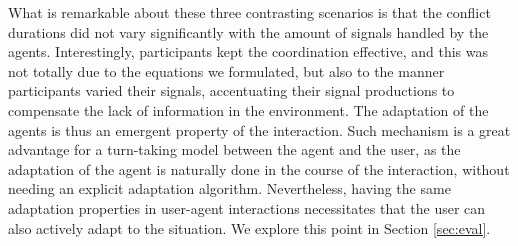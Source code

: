 What is remarkable about these three contrasting scenarios is that the conflict durations did not vary significantly with the amount of signals handled by the agents. Interestingly, participants kept the coordination effective, and this was not totally due to the equations we formulated, but also to the manner participants varied their signals, accentuating their signal productions to compensate the lack of information in the environment. The adaptation of the agents is thus an emergent property of the interaction. Such mechanism is a great advantage for a turn-taking model between the agent and the user, as the adaptation of the agent is naturally done in the course of the interaction, without needing an explicit adaptation algorithm. Nevertheless, having the same adaptation properties in user-agent interactions necessitates that the user can also actively adapt to the situation. We explore this point in Section \ref{sec:eval}.